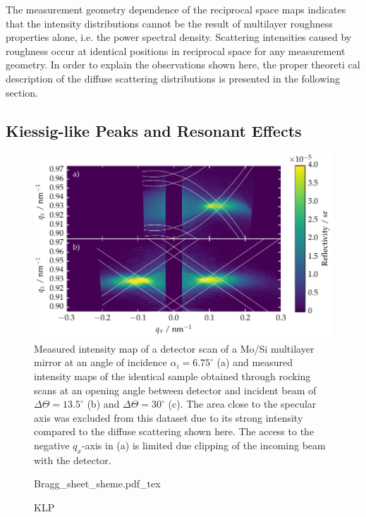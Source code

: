 The measurement geometry dependence of the reciprocal space maps indicates that the intensity distributions cannot be the result of multilayer roughness properties alone, i.e. the power spectral density. Scattering intensities caused by roughness occur at identical positions in reciprocal space for any measurement geometry. In order to explain the observations shown here, the proper theoreti
cal description of the diffuse scattering distributions is presented in the following section.

\subsection{Kiessig-like Peaks and Resonant Effects}
\begin{figure}[htbp]
        \includegraphics[width=\textwidth]{img/kiessig_like_peaks_diffuse_map} \caption{Measured intensity map of a detector scan of a Mo/Si multilayer mirror at an angle of incidence $\alpha_i = 6.75^\circ$ (a) and  measured intensity maps of the identical sample obtained through rocking scans at an opening angle between detector and incident beam of $\Delta \Theta = 13.5^\circ$ (b) and $\Delta \Theta = 30^\circ$ (c). The area close to the specular axis was excluded from this dataset due to its strong intensity compared to the diffuse scattering shown here. The access to the negative $q_x$-axis in (a) is limited due clipping of the incoming beam with the detector.} \label{fig:comparison} 
\end{figure}

\begin{figure}[htb]
    {Bragg_sheet_sheme.pdf_tex}
    \caption[Illustration of the four scattering processes of the DWBA.]{KLP}
    \label{ch_theo:fig_kiessig_like_peaks_scheme}
\end{figure}

